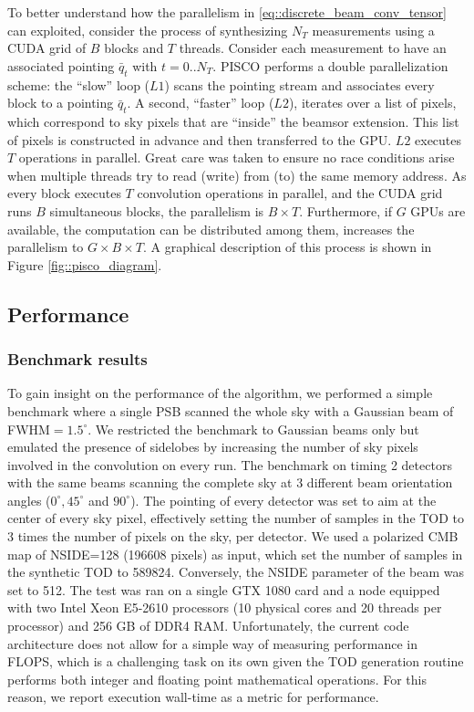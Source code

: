 \documentclass[a4paper,11pt]{article}
\begin{document}
To better understand how the parallelism in \ref{eq::discrete_beam_conv_tensor} can exploited, consider the process of synthesizing $N_T$ measurements using a CUDA grid of $B$ blocks and $T$ threads. Consider each measurement to have an associated pointing $\bar{q}_t$ with $t=0..N_T$. PISCO performs a double parallelization scheme: the ``slow'' loop ($L1$) scans the pointing stream and associates every block to a pointing $\bar{q}_t$. A second, ``faster'' loop ($L2$), iterates over a list of pixels, which correspond to sky pixels that are ``inside'' the beamsor extension. This list of pixels is constructed in advance and then transferred to the GPU. $L2$ executes $T$ operations in parallel. Great care was taken to ensure no race conditions arise when multiple threads try to read (write) from (to) the same memory address. As every block executes $T$ convolution operations in parallel, and the CUDA grid runs $B$ simultaneous blocks, the parallelism is $B \times T$. Furthermore, if $G$ GPUs are available, the computation can be distributed among them, increases the parallelism to $G \times B \times T$. A graphical description of this process is shown in Figure \ref{fig::pisco_diagram}.

\subsection{Performance}

\subsubsection{Benchmark results}


To gain insight on the performance of the algorithm, we performed a simple benchmark where a single PSB scanned the whole sky with a Gaussian beam of FWHM$=1.5^\circ$. We restricted the benchmark to Gaussian beams only but emulated the presence of sidelobes by increasing the number of sky pixels involved in the convolution on every run. The benchmark on timing 2 detectors with the same beams scanning the complete sky at 3 different beam orientation angles ($0^\circ,45^\circ$ and $90^\circ$). The pointing of every detector was set to aim at the center of every sky pixel, effectively setting the number of samples in the TOD to 3 times the number of pixels on the sky, per detector. We used a polarized CMB map of NSIDE=128 (196608 pixels) as input, which set the number of samples in the synthetic TOD to 589824. Conversely, the NSIDE parameter of the beam was set to 512. The test was ran on a single GTX 1080 card and a node equipped with two Intel Xeon E5-2610 processors (10 physical cores and 20 threads per processor) and 256 GB of DDR4 RAM. Unfortunately, the current code architecture does not allow for a simple way of measuring performance in FLOPS, which is a challenging task on its own given the TOD generation routine performs both integer and floating point mathematical operations. For this reason, we report execution wall-time as a metric for performance.
\end{document}
